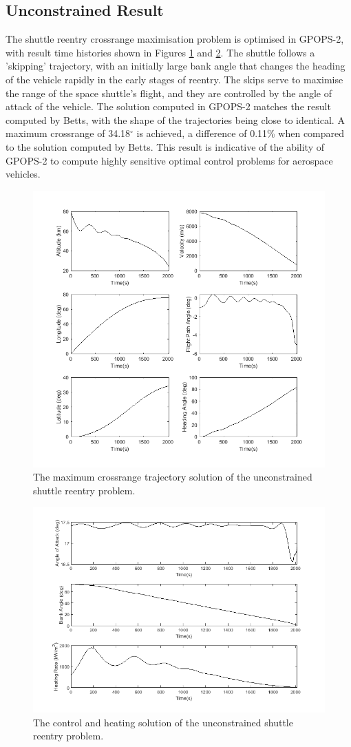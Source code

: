 \subsection{Unconstrained Result}
The shuttle reentry crossrange maximisation problem is optimised in GPOPS-2, with result time histories shown in Figures \ref{fig:SpaceShuttleNoq1} and \ref{fig:SpaceShuttleNoq2}. The shuttle follows a 'skipping' trajectory, with an initially large bank angle that changes the heading of the vehicle rapidly in the early stages of reentry. The skips serve to maximise the range of the space shuttle's flight, and they are controlled by the angle of attack of the vehicle. The solution computed in GPOPS-2 matches the result computed by Betts\cite{Betts2009}, with the shape of the trajectories being close to identical. A maximum crossrange of 34.18$^\circ$ is achieved, a difference of 0.11\% when compared to the solution computed by Betts\cite{Betts2009}. This result is indicative of the ability of GPOPS-2 to compute highly sensitive optimal control problems for aerospace vehicles. 
\begin{figure}[H]
\centering
\includegraphics[width=0.7\linewidth]{figures/A1_uncertainty-analysis/SpaceShuttleNoq1}
\caption{The maximum crossrange trajectory solution of the unconstrained shuttle reentry problem.}
\label{fig:SpaceShuttleNoq1}
\end{figure}
\begin{figure}[H]
\centering
\includegraphics[width=0.7\linewidth]{figures/A1_uncertainty-analysis/SpaceShuttleNoq2}
\caption{The control and heating solution of the unconstrained shuttle reentry problem.}
\label{fig:SpaceShuttleNoq2}
\end{figure}

